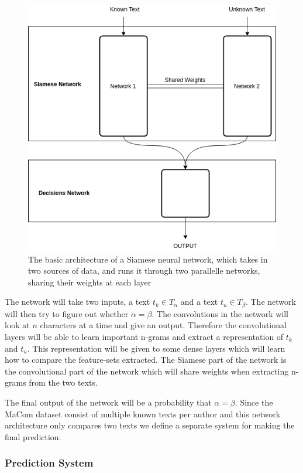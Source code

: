 \begin{figure}
\centering
\includegraphics[scale=0.5]{./pictures/method/Siamese.png}
\caption{The basic architecture of a Siamese neural network, which takes
in two sources of data, and runs it through two parallelle networks, sharing
their weights at each layer}
\end{figure}

The network will take two inputs, a text $t_k \in T_\alpha$ and a text $t_u
\in T_\beta$. The network will then try to figure out whether $\alpha =
\beta$. The convolutions in the network will look at $n$ characters at a
time and give an output. Therefore the convolutional layers will be able to
learn important n-grams and extract a representation of $t_k$ and $t_u$. This
representation will be given to some dense layers which will learn how to
compare the feature-sets extracted. The Siamese part of the network is the
convolutional part of the network which will share weights when extracting
n-grams from the two texts.

The final output of the network will be a probability that $\alpha = \beta$.
Since the MaCom dataset consist of multiple known texts per author and this
network architecture only compares two texts we define a separate system for
making the final prediction.

\subsubsection{Prediction System}

